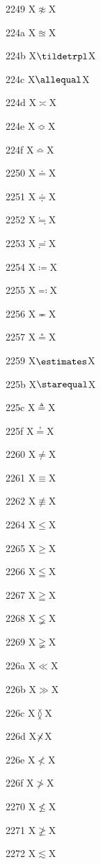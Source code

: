 \documentclass[11pt]{article}
\begin{document}
2249 X{\ensuremath{\napprox}}X

224a X{\ensuremath{\approxeq}}X

224b X{\ensuremath{\tildetrpl}}X

224c X{\ensuremath{\allequal}}X

224d X{\ensuremath{\asymp}}X

224e X{\ensuremath{\Bumpeq}}X

224f X{\ensuremath{\bumpeq}}X

2250 X{\ensuremath{\doteq}}X

2251 X{\ensuremath{\doteqdot}}X

2252 X{\ensuremath{\fallingdotseq}}X

2253 X{\ensuremath{\risingdotseq}}X

2254 X{\ensuremath{\coloneq}}X

2255 X{\ensuremath{\eqcolon}}X

2256 X{\ensuremath{\eqcirc}}X

2257 X{\ensuremath{\circeq}}X

2259 X{\ensuremath{\estimates}}X

225b X{\ensuremath{\starequal}}X

225c X{\ensuremath{\triangleq}}X

225f X{\ensuremath{\questeq}}X

2260 X{\ensuremath{\ne}}X

2261 X{\ensuremath{\equiv}}X

2262 X{\ensuremath{\nequiv}}X

2264 X{\ensuremath{\leq}}X

2265 X{\ensuremath{\geq}}X

2266 X{\ensuremath{\leqq}}X

2267 X{\ensuremath{\geqq}}X

2268 X{\ensuremath{\lneqq}}X

2269 X{\ensuremath{\gneqq}}X

226a X{\ensuremath{\ll}}X

226b X{\ensuremath{\gg}}X

226c X{\ensuremath{\between}}X

226d X{\ensuremath{\not\kern-0.3em\times}}X

226e X{\ensuremath{\nless}}X

226f X{\ensuremath{\ngtr}}X

2270 X{\ensuremath{\nleq}}X

2271 X{\ensuremath{\ngeq}}X

2272 X{\ensuremath{\lesssim}}X
\end{document}
